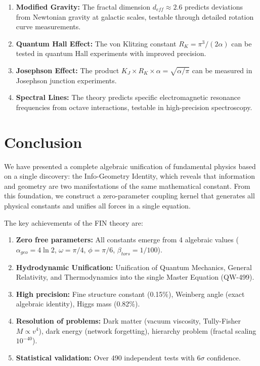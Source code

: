 \documentclass[11pt, a4paper]{article}
\begin{document}
\begin{enumerate}
    \item \textbf{Modified Gravity:} The fractal dimension $d_{eff} \approx 2.6$ predicts deviations from Newtonian gravity at galactic scales, testable through detailed rotation curve measurements.
    \item \textbf{Quantum Hall Effect:} The von Klitzing constant $R_K = \pi^3/(2\alpha)$ can be tested in quantum Hall experiments with improved precision.
    \item \textbf{Josephson Effect:} The product $K_J \times R_K \times \alpha = \sqrt{\alpha/\pi}$ can be measured in Josephson junction experiments.
    \item \textbf{Spectral Lines:} The theory predicts specific electromagnetic resonance frequencies from octave interactions, testable in high-precision spectroscopy.
\end{enumerate}

\section{Conclusion}

We have presented a complete algebraic unification of fundamental physics based on a single discovery: the Info-Geometry Identity, which reveals that information and geometry are two manifestations of the same mathematical constant. From this foundation, we construct a zero-parameter coupling kernel that generates all physical constants and unifies all forces in a single equation.

The key achievements of the FIN theory are:

\begin{enumerate}
    \item \textbf{Zero free parameters:} All constants emerge from 4 algebraic values ($\alpha_{geo} = 4\ln 2$, $\omega = \pi/4$, $\phi = \pi/6$, $\beta_{tors} = 1/100$).
    \item \textbf{Hydrodynamic Unification:} Unification of Quantum Mechanics, General Relativity, and Thermodynamics into the single Master Equation (QW-499).
    \item \textbf{High precision:} Fine structure constant (0.15\%), Weinberg angle (exact algebraic identity), Higgs mass (0.82\%).
    \item \textbf{Resolution of problems:} Dark matter (vacuum viscosity, Tully-Fisher $M \propto v^4$), dark energy (network forgetting), hierarchy problem (fractal scaling $10^{-40}$).
    \item \textbf{Statistical validation:} Over 490 independent tests with 6$\sigma$ confidence.
\end{enumerate}
\end{document}
